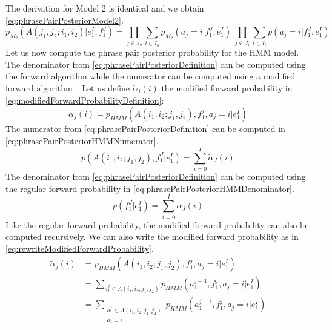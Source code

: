 %
The derivation for Model 2 is identical and we obtain
\autoref{eq:phrasePairPosteriorModel2}.
%
\begin{equation}
  p_{M_2}(A(j_1, j_2; i_1, i_2) | e_1^I, f_1^J) = \prod_{j \in J_o} \sum_{i \in I_o} p_{M_2}(a_j = i | f_1^J, e_1^I) \ \prod_{j \in J_i} \sum_{i \in I_i} p(a_j = i | f_1^J, e_1^I)
  \label{eq:phrasePairPosteriorModel2}
\end{equation}
%
Let us now compute the phrase pair posterior probability for the HMM model. The
denominator from \autoref{eq:phrasePairPosteriorDefinition} can be computed using
the forward algorithm while the numerator can be computed using a modified
forward algorithm~\citep{deng:2005:PHD}. Let us define $\tilde{\alpha}_j(i)$ the
modified forward probability in \autoref{eq:modifiedForwardProbabilityDefinition}:
%
\begin{equation}
  \tilde{\alpha}_j(i) = p_{HMM}(A(i_1,i_2;j_1,j_2), f_1^j, a_j=i | e_1^I)
  \label{eq:modifiedForwardProbabilityDefinition}
\end{equation}
%
The numerator from \autoref{eq:phrasePairPosteriorDefinition} can be computed
in \autoref{eq:phrasePairPosteriorHMMNumerator}.
%
\begin{equation}
  p(A(i_1, i_2; j_1, j_2), f_1^J | e_1^I) = \sum_{i=0}^I \tilde{\alpha}_J(i)
  \label{eq:phrasePairPosteriorHMMNumerator}
\end{equation}
%
The denominator from \autoref{eq:phrasePairPosteriorDefinition} can be computed
using the regular forward probability in
\autoref{eq:phrasePairPosteriorHMMDenominator}.
%
\begin{equation}
  p(f_1^J | e_1^I) = \sum_{i=0}^I \alpha_J(i)
  \label{eq:phrasePairPosteriorHMMDenominator}
\end{equation}
%
Like the regular forward probability, the modified forward probability can also
be computed recursively. We can also write the modified forward probability as
in \autoref{eq:rewriteModifiedForwardProbability}.
%
\begin{equation}
  \begin{split}
  \tilde{\alpha}_j(i) &= p_{HMM}(A(i_1,i_2;j_1,j_2), f_1^j, a_j=i | e_1^I) \\
                      &= \sum_{a_1^{j} \in A(i_1,i_2;j_1,j_2)} p_{HMM}(a_1^{j-1}, f_1^j, a_j=i | e_1^I) \\
                      &= \sum_{\substack{a_1^{j} \in A(i_1,i_2;j_1,j_2) \\ a_j=i}} p_{HMM}(a_1^{j-1}, f_1^j, a_j=i | e_1^I)
  \end{split}
  \label{eq:rewriteModifiedForwardProbability}
\end{equation}

